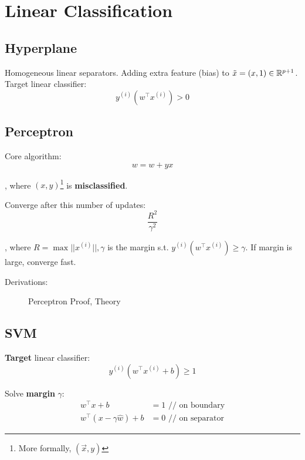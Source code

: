 \documentclass[a4paper]{report}
\begin{document}
\chapter{Linear Classification}
\section{Hyperplane} 
Homogeneous linear separators. Adding extra feature (bias) to $\tilde x=(x,1)\in \mathbb{R}^{p+1}$. 
Target linear classifier:
$$
y^{(i)}(w^\top x^{(i)}) > 0
$$
\section{Perceptron}
Core algorithm:
$$
w = w+yx
$$

, where $(x, y)$\footnote{More formally, $(\vec x, y)$} is \textbf{misclassified}. 

Converge after this number of updates: 
$$
\frac{R^2}{\gamma^2}
$$

, where $R=\max ||x^{(i)}||, \gamma $ is the margin s.t. $y^{(i)}(w^\top x^{(i)}) \geq \gamma$. If margin is large, converge fast. 

Derivations:
\begin{figure}[!htp]
\centering
{}
\caption{Perceptron Proof, Theory}
\label{fig:perceptronTheory}
\end{figure}

\section{SVM}
\textbf{Target} linear classifier:
$$
y^{(i)} (w^\top x^{(i)}+b) \geq 1 
$$

Solve \textbf{margin} $\gamma$:
\begin{align*}
w^\top x + b &=1 \text{ // on boundary}\\
w^\top(x-\gamma \hat w)+b &= 0 \text{ // on separator}
\end{align*}
\end{document}

